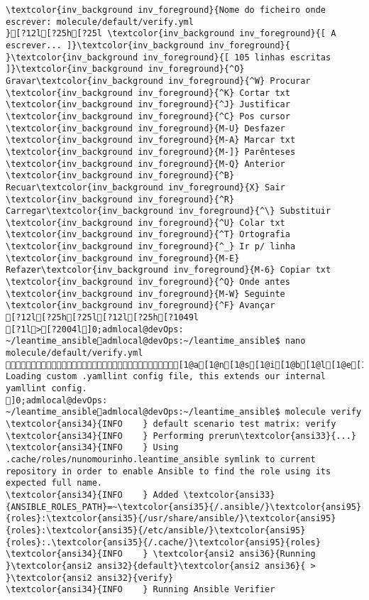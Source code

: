 \documentclass{scrartcl}
\begin{document}
\begin{Verbatim}
\textcolor{inv_background inv_foreground}{Nome do ficheiro onde escrever: molecule/default/verify.yml                                                                                                                                  }[?12l[?25h[?25l \textcolor{inv_background inv_foreground}{[ A escrever... ]}\textcolor{inv_background inv_foreground}{          }\textcolor{inv_background inv_foreground}{[ 105 linhas escritas ]}\textcolor{inv_background inv_foreground}{^O} Gravar\textcolor{inv_background inv_foreground}{^W} Procurar      \textcolor{inv_background inv_foreground}{^K} Cortar txt    \textcolor{inv_background inv_foreground}{^J} Justificar    \textcolor{inv_background inv_foreground}{^C} Pos cursor    \textcolor{inv_background inv_foreground}{M-U} Desfazer     \textcolor{inv_background inv_foreground}{M-A} Marcar txt   \textcolor{inv_background inv_foreground}{M-]} Parênteses   \textcolor{inv_background inv_foreground}{M-Q} Anterior     \textcolor{inv_background inv_foreground}{^B} Recuar\textcolor{inv_background inv_foreground}{X} Sair    \textcolor{inv_background inv_foreground}{^R} Carregar\textcolor{inv_background inv_foreground}{^\} Substituir    \textcolor{inv_background inv_foreground}{^U} Colar txt     \textcolor{inv_background inv_foreground}{^T} Ortografia    \textcolor{inv_background inv_foreground}{^_} Ir p/ linha   \textcolor{inv_background inv_foreground}{M-E} Refazer\textcolor{inv_background inv_foreground}{M-6} Copiar txt   \textcolor{inv_background inv_foreground}{^Q} Onde antes    \textcolor{inv_background inv_foreground}{M-W} Seguinte     \textcolor{inv_background inv_foreground}{^F} Avançar
[?12l[?25h[?25l[?12l[?25h[?1049l
[?1l>[?2004l]0;admlocal@devOps: ~/leantime_ansibleadmlocal@devOps:~/leantime_ansible$ nano molecule/default/verify.yml [1@a[1@n[1@s[1@i[1@b[1@l[1@e[1@-[1@l[1@i[1@n[1@t
Loading custom .yamllint config file, this extends our internal yamllint config.
]0;admlocal@devOps: ~/leantime_ansibleadmlocal@devOps:~/leantime_ansible$ molecule verify
\textcolor{ansi34}{INFO    } default scenario test matrix: verify
\textcolor{ansi34}{INFO    } Performing prerun\textcolor{ansi33}{...}
\textcolor{ansi34}{INFO    } Using .cache/roles/nunomourinho.leantime_ansible symlink to current repository in order to enable Ansible to find the role using its expected full name.
\textcolor{ansi34}{INFO    } Added \textcolor{ansi33}{ANSIBLE_ROLES_PATH}=~\textcolor{ansi35}{/.ansible/}\textcolor{ansi95}{roles}:\textcolor{ansi35}{/usr/share/ansible/}\textcolor{ansi95}{roles}:\textcolor{ansi35}{/etc/ansible/}\textcolor{ansi95}{roles}:.\textcolor{ansi35}{/.cache/}\textcolor{ansi95}{roles}
\textcolor{ansi34}{INFO    } \textcolor{ansi2 ansi36}{Running }\textcolor{ansi2 ansi32}{default}\textcolor{ansi2 ansi36}{ > }\textcolor{ansi2 ansi32}{verify}
\textcolor{ansi34}{INFO    } Running Ansible Verifier


\end{Verbatim}
\end{document}
